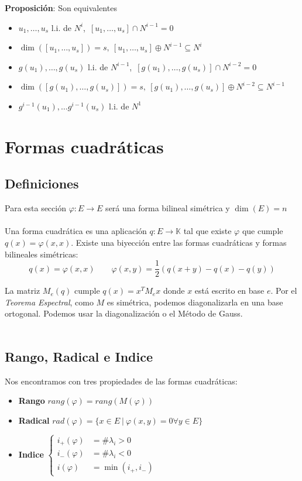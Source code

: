 \documentclass{myclass}
\renewcommand{\phi}{\varphi}
\begin{document}
\textbf{Proposición}: Son equivalentes
\begin{itemize}
    \item $u_1, \ldots , u_s$ l.i. de $N^i$,\  $[u_1, \ldots , u_s]\cap N^{i-1}=0$
    \item $\dim([u_1, \ldots, u_s]) = s, \ [u_1, \ldots , u_s]\oplus N^{i-1} \subseteq N^i$
    \item $g(u_1), \ldots , g(u_s)$ l.i. de $N^{i-1}$,\  $[g(u_1), \ldots , g(u_s)]\cap N^{i-2}=0$
    \item $\dim([g(u_1), \ldots, g(u_s)]) = s, \ [g(u_1), \ldots , g(u_s)]\oplus N^{i-2} \subseteq N^{i-1}$
    \item $g^{i-1}(u_1), \ldots g^{i-1}(u_s)$ l.i. de $N^1$
\end{itemize}

\section{Formas cuadráticas}
\subsection{Definiciones}
Para esta sección $\varphi:E\to E$ será una forma bilineal simétrica y $\dim(E)=n$ \\
\\
Una forma cuadrática es una aplicación $q:E\to \mathbb{K}$ tal que existe $\varphi$ que cumple $q(x)=\phi(x,x)$. Existe una biyección entre las formas cuadráticas y formas bilineales simétricas:
$$
q(x) = \phi(x,x) \qquad \varphi(x,y)=\frac{1}{2}(q(x+y)-q(x) - q(y))
$$



La matriz $M_e(q)$ cumple $q(x)= x^TM_ex$ donde $x$ está escrito en base $e$. Por el \textit{Teorema Espectral}, como $M$ es simétrica, podemos diagonalizarla en una base ortogonal. Podemos usar la diagonalización o el Método de Gauss. \\
\\
\subsection{Rango, Radical e Indice}
Nos encontramos con tres propiedades de las formas cuadráticas:
\begin{itemize}
    \item \textbf{Rango} $rang(\phi) = rang(M(\phi))$
    \item \textbf{Radical} $rad(\phi)=\{x\in E \ | \ \phi(x,y)=0 \forall y\in E\}$
    \item \textbf{Indice} $\begin{cases} 
    i_+(\phi) &= \# \lambda_i>0 \\
    i_-(\phi) &= \# \lambda_i<0 \\
    i(\phi) &= \min(i_+, i_-)
    \end{cases}$
\end{itemize}
\end{document}
